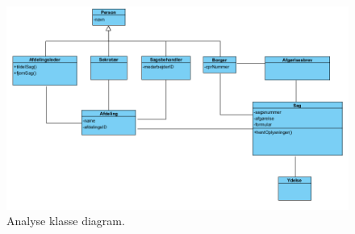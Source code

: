 \begin{figure}[h]
  \includegraphics[width=\linewidth]{./PNG/analyseKlasseDiagram.PNG} 
  \caption{Analyse klasse diagram.}
  \label{fig:AKlasse}
\end{figure}

